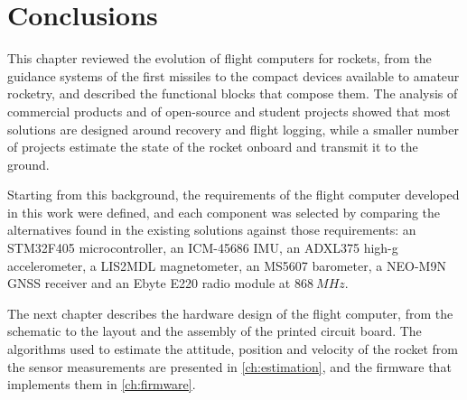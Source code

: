 
\section{Conclusions}

This chapter reviewed the evolution of flight computers for rockets, from the guidance systems of the first missiles to the compact devices available to amateur rocketry, and described the functional blocks that compose them. The analysis of commercial products and of open-source and student projects showed that most solutions are designed around recovery and flight logging, while a smaller number of projects estimate the state of the rocket onboard and transmit it to the ground. 

Starting from this background, the requirements of the flight computer developed in this work were defined, and each component was selected by comparing the alternatives found in the existing solutions against those requirements: an STM32F405 microcontroller, an ICM-45686 IMU, an ADXL375 high-g accelerometer, a LIS2MDL magnetometer, an MS5607 barometer, a NEO-M9N GNSS receiver and an Ebyte E220 radio module at $\SI{868}{MHz}$.

The next chapter describes the hardware design of the flight computer, from the schematic to the layout and the assembly of the printed circuit board. The algorithms used to estimate the attitude, position and velocity of the rocket from the sensor measurements are presented in \cref{ch:estimation}, and the firmware that implements them in \cref{ch:firmware}.